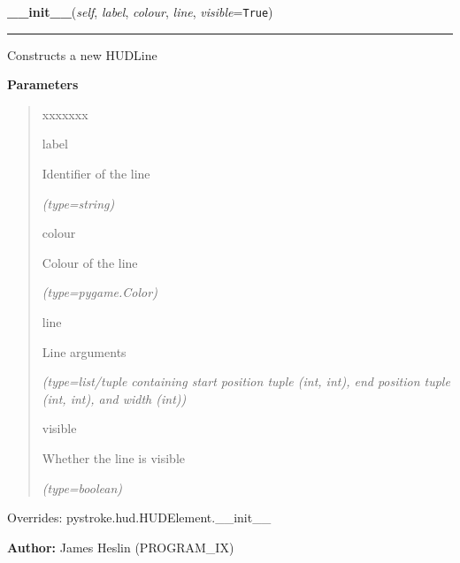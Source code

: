 \hspace{.8\funcindent}\begin{boxedminipage}{\funcwidth}

    \raggedright \textbf{\_\_init\_\_}(\textit{self}, \textit{label}, \textit{colour}, \textit{line}, \textit{visible}={\tt True})

    \vspace{-1.5ex}

    \rule{\textwidth}{0.5\fboxrule}
\setlength{\parskip}{2ex}
    Constructs a new HUDLine

\setlength{\parskip}{1ex}
      \textbf{Parameters}
      \vspace{-1ex}

      \begin{quote}
        \begin{Ventry}{xxxxxxx}

          \item[label]

          Identifier of the line

            {\it (type=string)}

          \item[colour]

          Colour of the line

            {\it (type=pygame.Color)}

          \item[line]

          Line arguments

            {\it (type=list/tuple containing start position tuple (int, int), end position tuple 
(int, int), and width (int))}

          \item[visible]

          Whether the line is visible

            {\it (type=boolean)}

        \end{Ventry}

      \end{quote}

      Overrides: pystroke.hud.HUDElement.\_\_init\_\_

\textbf{Author:} James Heslin (PROGRAM\_IX)



    \end{boxedminipage}

    \vspace{0.5ex}

